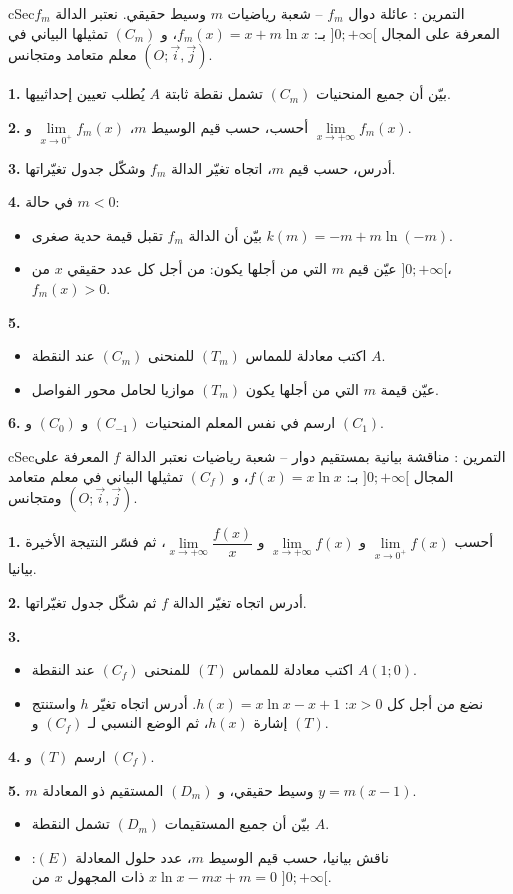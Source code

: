 \documentclass[12pt,a4paper]{article}
\newenvironment{BOX}[2]{\begin{otherlanguage}{english}\begin{arbox}{#1}{#2}}{\end{arbox}\end{otherlanguage}}
\newcounter{exo}
\newenvironment{tamrin}[1]{\stepcounter{exo}\begin{BOX}{cSec}{التمرين \theexo: #1}}{\end{BOX}}
\newenvironment{sq}{\begin{itemize}[leftmargin=2.4em,itemsep=3pt]}{\end{itemize}}
\newcommand{\qa}{\item[(أ)]}\newcommand{\qb}{\item[(ب)]}\newcommand{\qc}{\item[(جـ)]}\newcommand{\qd}{\item[(د)]}\newcommand{\qe}{\item[(هـ)]}
\newcommand{\QQ}[1]{\par\smallskip\textbf{#1.} }
\begin{document}
\begin{tamrin}{عائلة دوال $f_m$ -- شعبة رياضيات}
$m$ وسيط حقيقي. نعتبر الدالة $f_m$ المعرفة على المجال $]0;+\infty[$ بـ: $f_m(x)=x+m\ln x$، و $(C_m)$ تمثيلها البياني في معلم متعامد ومتجانس $(O;\vec i,\vec j)$.
\QQ{1} بيّن أن جميع المنحنيات $(C_m)$ تشمل نقطة ثابتة $A$ يُطلب تعيين إحداثييها.
\QQ{2} أحسب، حسب قيم الوسيط $m$، $\lim\limits_{x\to 0^{+}}f_m(x)$ و $\lim\limits_{x\to +\infty}f_m(x)$.
\QQ{3} أدرس، حسب قيم $m$، اتجاه تغيّر الدالة $f_m$ وشكّل جدول تغيّراتها.
\QQ{4} في حالة $m<0$:
\begin{sq}
\qa بيّن أن الدالة $f_m$ تقبل قيمة حدية صغرى $k(m)=-m+m\ln(-m)$.
\qb عيّن قيم $m$ التي من أجلها يكون: من أجل كل عدد حقيقي $x$ من $]0;+\infty[$، $f_m(x)>0$.
\end{sq}
\QQ{5}
\begin{sq}
\qa اكتب معادلة للمماس $(T_m)$ للمنحنى $(C_m)$ عند النقطة $A$.
\qb عيّن قيمة $m$ التي من أجلها يكون $(T_m)$ موازيا لحامل محور الفواصل.
\end{sq}
\QQ{6} ارسم في نفس المعلم المنحنيات $(C_{-1})$ و $(C_{0})$ و $(C_{1})$.
\end{tamrin}

\begin{tamrin}{مناقشة بيانية بمستقيم دوار -- شعبة رياضيات}
نعتبر الدالة $f$ المعرفة على المجال $]0;+\infty[$ بـ: $f(x)=x\ln x$، و $(C_f)$ تمثيلها البياني في معلم متعامد ومتجانس $(O;\vec i,\vec j)$.
\QQ{1} أحسب $\lim\limits_{x\to 0^{+}}f(x)$ و $\lim\limits_{x\to +\infty}f(x)$ و $\lim\limits_{x\to +\infty}\dfrac{f(x)}{x}$، ثم فسّر النتيجة الأخيرة بيانيا.
\QQ{2} أدرس اتجاه تغيّر الدالة $f$ ثم شكّل جدول تغيّراتها.
\QQ{3}
\begin{sq}
\qa اكتب معادلة للمماس $(T)$ للمنحنى $(C_f)$ عند النقطة $A(1;0)$.
\qb نضع من أجل كل $x>0$: $h(x)=x\ln x-x+1$. أدرس اتجاه تغيّر $h$ واستنتج إشارة $h(x)$، ثم الوضع النسبي لـ $(C_f)$ و $(T)$.
\end{sq}
\QQ{4} ارسم $(T)$ و $(C_f)$.
\QQ{5} $m$ وسيط حقيقي، و $(D_m)$ المستقيم ذو المعادلة $y=m(x-1)$.
\begin{sq}
\qa بيّن أن جميع المستقيمات $(D_m)$ تشمل النقطة $A$.
\qb ناقش بيانيا، حسب قيم الوسيط $m$، عدد حلول المعادلة $(E)$: $x\ln x-mx+m=0$ ذات المجهول $x$ من $]0;+\infty[$.
\end{sq}
\end{tamrin}
\end{document}
